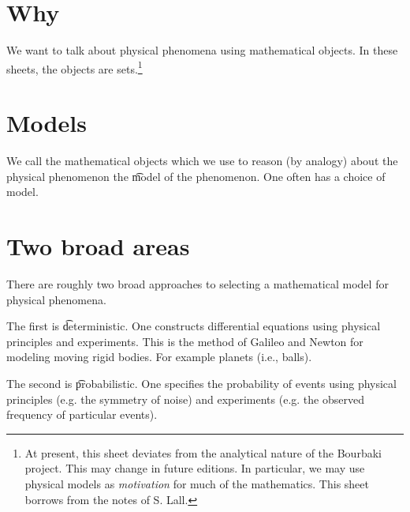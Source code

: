 

\section*{Why}

We want to talk about physical phenomena using mathematical objects.
In these sheets, the objects are sets.\footnote{At present, this sheet deviates from the analytical nature of the Bourbaki project. This may change in future editions. In particular, we may use physical models as \textit{motivation} for much of the mathematics. This sheet borrows from the notes of S. Lall.}

\section*{Models}

We call the mathematical objects which we use to reason (by analogy) about the physical phenomenon the \t{model} of the phenomenon.
One often has a choice of model.

\section*{Two broad areas}

There are roughly two broad approaches to selecting a mathematical model for physical phenomena.

The first is \t{deterministic}.
One constructs differential equations using physical principles and experiments.
This is the method of Galileo and Newton for modeling moving rigid bodies.
For example planets (i.e., balls).

The second is \t{probabilistic}.
One specifies the probability of events using physical principles (e.g. the symmetry of noise) and experiments (e.g. the observed frequency of particular events).

\blankpage